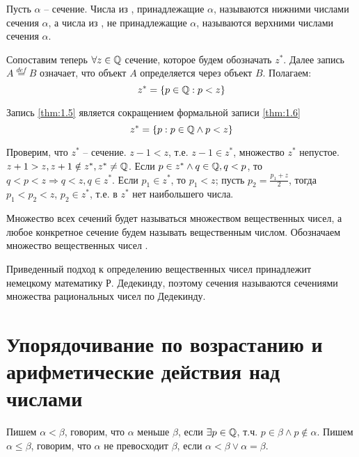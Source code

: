\documentclass[main]{subfiles}
\begin{document}
\begin{term}
    Пусть $\alpha$ -- сечение. Числа из \Q, принадлежащие $\alpha$, называются
    нижними числами сечения $\alpha$, а числа из \Q, не принадлежащие $\alpha$,
    называются верхними числами сечения $\alpha$.
\end{term}

Сопоставим теперь $\forall z \in \mathbb{Q}$ сечение, которое будем обозначать $z^*$.
Далее запись $A \overset{def}{=} B$ означает, что объект $A$ определяется через 
объект $B$. Полагаем:
\begin{equation}
    \label{thm:1.5}
    z^* = \{ p \in \mathbb{Q} : p < z \} 
\end{equation}

Запись \eqref{thm:1.5} является сокращением формальной записи \eqref{thm:1.6}
\begin{equation}
    \label{thm:1.6}
    z^* = \{ p: p \in \mathbb{Q} \wedge p < z \} 
\end{equation}

Проверим, что $z^*$ -- сечение. $z - 1 < z$, т.е. $z - 1 \in z^*$,
множество $z^*$ непустое. $z + 1 > z, z + 1 \notin z^*, z^* \neq \mathbb{Q}$.
Если $p \in z^* \wedge q \in \mathbb{Q}, q < p$, то $q < p < z \Rightarrow 
q < z, q \in z^*$. Если $p_1 \in z^*$, то ${p_1 < z}$; 
пусть $p_2 = \frac{p_1 + z}{2}$, тогда $p_1 < p_2 < z$, $p_2 \in z^*$, т.е.
в $z^*$ нет наибольшего числа.

\begin{definition}
    Множество всех сечений будет называться множеством вещественных чисел, а любое
    конкретное сечение будем называть вещественным числом. Обозначаем множество 
    вещественных чисел \R.
\end{definition}

Приведенный подход к определению вещественных чисел принадлежит немецкому 
математику Р. Дедекинду, поэтому сечения называются сечениями множества
рациональных чисел по Дедекинду.

\section{Упорядочивание по возрастанию и арифметические действия над \R числами}
\begin{definition}
    Пишем $\alpha < \beta$, говорим, что $\alpha$ меньше $\beta$, если 
    $\exists p \in \mathbb{Q}$, т.ч. $p \in \beta \wedge p \notin \alpha$. 
    Пишем $\alpha \leq \beta$, говорим, что $\alpha$ не превосходит $\beta$,
    если $\alpha < \beta \vee \alpha = \beta$.
\end{definition}
\end{document}
